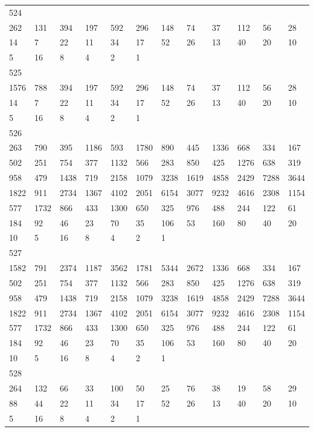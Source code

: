 \begin{longtable}{llllllllllll}
524&&&&&&&&&&&\\
262& 131& 394& 197& 592& 296& 148& 74& 37& 112& 56& 28\\
14& 7& 22& 11& 34& 17& 52& 26& 13& 40& 20& 10\\
5& 16& 8& 4& 2& 1& \\

525&&&&&&&&&&&\\
1576& 788& 394& 197& 592& 296& 148& 74& 37& 112& 56& 28\\
14& 7& 22& 11& 34& 17& 52& 26& 13& 40& 20& 10\\
5& 16& 8& 4& 2& 1& \\

526&&&&&&&&&&&\\
263& 790& 395& 1186& 593& 1780& 890& 445& 1336& 668& 334& 167\\
502& 251& 754& 377& 1132& 566& 283& 850& 425& 1276& 638& 319\\
958& 479& 1438& 719& 2158& 1079& 3238& 1619& 4858& 2429& 7288& 3644\\
1822& 911& 2734& 1367& 4102& 2051& 6154& 3077& 9232& 4616& 2308& 1154\\
577& 1732& 866& 433& 1300& 650& 325& 976& 488& 244& 122& 61\\
184& 92& 46& 23& 70& 35& 106& 53& 160& 80& 40& 20\\
10& 5& 16& 8& 4& 2& 1& \\

527&&&&&&&&&&&\\
1582& 791& 2374& 1187& 3562& 1781& 5344& 2672& 1336& 668& 334& 167\\
502& 251& 754& 377& 1132& 566& 283& 850& 425& 1276& 638& 319\\
958& 479& 1438& 719& 2158& 1079& 3238& 1619& 4858& 2429& 7288& 3644\\
1822& 911& 2734& 1367& 4102& 2051& 6154& 3077& 9232& 4616& 2308& 1154\\
577& 1732& 866& 433& 1300& 650& 325& 976& 488& 244& 122& 61\\
184& 92& 46& 23& 70& 35& 106& 53& 160& 80& 40& 20\\
10& 5& 16& 8& 4& 2& 1& \\

528&&&&&&&&&&&\\
264& 132& 66& 33& 100& 50& 25& 76& 38& 19& 58& 29\\
88& 44& 22& 11& 34& 17& 52& 26& 13& 40& 20& 10\\
5& 16& 8& 4& 2& 1& \\


\end{longtable}
